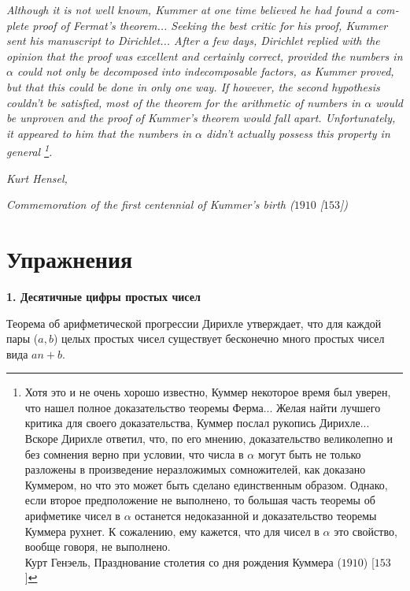 \documentclass{mai_book}
\begin{document}
\begin{english}

\hangindent=3cm 
\textit{Although it is not well known, Kummer at one time believed he had found a complete proof of Fermat's theorem... Seeking the
best critic for his proof, Kummer sent his manu\-script to Dirichlet...
After a few days, Dirichlet replied with the opinion that the proof
was excellent and certainly correct, provided the numbers in $\alpha$ could
not only be decomposed into indecomposable factors, as Kummer
proved, but that this could be done in only one way. If however,
the second hypothesis couldn't be satisfied, most of the theorem for
the arithmetic of numbers in $\alpha$ would be unproven and the proof
of Kummer's theorem would fall apart. Unfortunately, it appeared to him that the numbers in $\alpha$ didn't actually possess this property in
general \footnote{Хотя это и не очень хорошо известно, Куммер некоторое время был уверен, что нашел полное доказательство теоремы Ферма... Желая найти лучшего критика для своего доказательства, Куммер послал рукопись Дирихле... Вскоре Дирихле ответил, что, по его мнению, доказательство великолепно и без сомнения верно при условии, что числа в $\alpha$ могут быть не только разложены в произведение неразложимых сомножителей, как доказано Куммером, но что это может быть сделано единственным образом. Однако, если второе предположение не выполнено, то большая часть теоремы об арифметике чисел в $\alpha$ останется недоказанной и доказательство теоремы Куммера рухнет. К сожалению, ему кажется, что для чисел в $\alpha$ это свойство,
вообще говоря, не выполнено. \\ \indent Курт Генэель, Празднование столетия со дня рождения Куммера ($1910$) [$153$]}.}

\begin{flushright}
\textit{Kurt Hensel,}

\textit{Commemoration of the first centennial of Kummer's birth ($1910$ [$153$])}
\end{flushright}

\end{english}

\pagebreak

\section{Упражнения}

\noindent \textbf{1. Десятичные цифры простых чисел}

Теорема об арифметической прогрессии Дирихле утверждает, что
для каждой пары ($a, b$) целых простых чисел существует бесконечно
много простых чисел вида $an+b$. 
\end{document}
